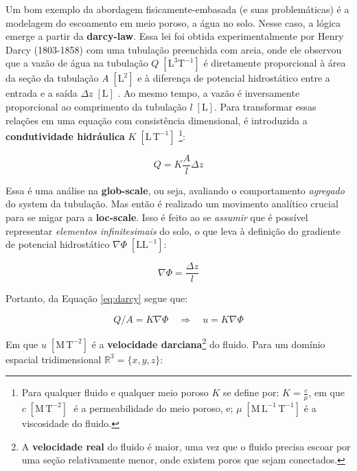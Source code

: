 \documentclass[./main.tex]{subfiles}
\begin{document}
\par Um bom exemplo da abordagem fisicamente-embasada (e suas problemáticas) é a modelagem do escoamento em meio poroso, a água no solo. Nesse caso, a lógica emerge a partir da \textbf{\gls{darcy-law}}. Essa lei foi obtida experimentalmente por Henry Darcy (1803-1858) com uma tubulação preenchida com areia, onde ele observou que a vazão de água na tubulação $Q \; [\text{L}^{3}\text{T}^{-1}]$ é diretamente proporcional à área da seção da tubulação $A \; [\text{L}^{2}]$ e à diferença de potencial hidrostático entre a entrada e a saída $\Delta z \; [\text{L}]$ \cite{Simmons2008a}. Ao mesmo tempo, a vazão é inversamente proporcional ao comprimento da tubulação $l \; [\text{L}]$. Para transformar essas relações em uma equação com consistência dimensional, é introduzida a \textbf{condutividade hidráulica} $K \; [\text{L}\,\text{T}^{-1}]$ \footnote{Para qualquer fluido e qualquer meio poroso $K$ se define por: $K = \frac{c}{\mu}$, em que $c \; [\text{M}\,\text{T}^{-2}]\;$ é a permeabilidade do meio poroso, e; $\mu \; [\text{M}\,\text{L}^{-1}\,\text{T}^{-1}]$ é a viscosidade do fluido.}:
\begin{linenomath*}
\begin{equation}
\label{eq:darcy}
Q  = K \frac{A}{l}\Delta z 
\end{equation}
\end{linenomath*}
\noindent Essa é uma análise na \textbf{\gls{glob-scale}}, ou seja, avaliando o comportamento \textit{agregado} do \gls{system} da tubulação. Mas então é realizado um movimento analítico crucial para se migar para a \textbf{\gls{loc-scale}}. Isso é feito ao se \textit{assumir} que é possível representar \textit{elementos infinitesimais} do solo, o que leva à definição do gradiente de potencial hidrostático $\nabla \Phi \; [\text{L}\text{L}^{-1}]$:
\begin{linenomath*}
\begin{equation}
\label{eq:darcy-2}
\nabla \Phi = \frac{\Delta z}{l} 
\end{equation}
\end{linenomath*}
\noindent Portanto, da Equação \eqref{eq:darcy} segue que:
\begin{linenomath*}
\begin{equation}
\label{eq:darcy-3}
Q/A = K \nabla \Phi \quad \Rightarrow \quad u = K \nabla \Phi
\end{equation}
\end{linenomath*}
\noindent Em que $u \; [\text{M}\,\text{T}^{-2}]$ é a \textbf{velocidade darciana}\footnote{A \textbf{velocidade real} do fluido é maior, uma vez que o fluido precisa escoar por uma seção relativamente menor, onde existem poros que sejam conectados.} do fluido. Para um domínio espacial tridimensional $\mathbb{R}^3=\{x, y, z \}$:
\end{document}
